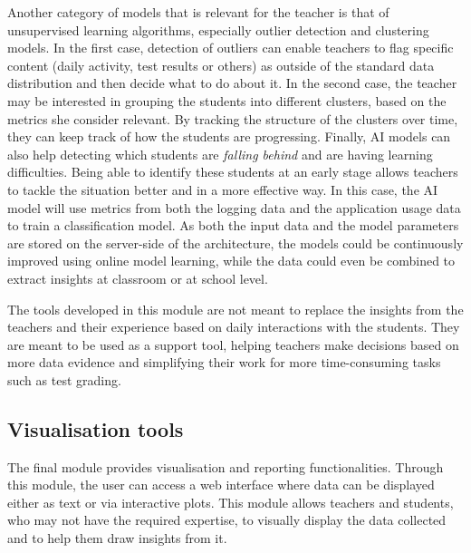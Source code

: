 Another category of models that is relevant for the teacher is that of unsupervised learning algorithms, especially outlier detection and clustering models. In the first case, detection of outliers can enable teachers to flag specific content (daily activity, test results or others) as outside of the standard data distribution and then decide what to do about it. In the second case, the teacher may be interested in grouping the students into different clusters, based on the metrics she consider relevant. By tracking the structure of the clusters over time, they can keep track of how the students are progressing. Finally, AI models can also help detecting which students are \textit{falling behind} and are having learning difficulties. Being able to identify these students at an early stage allows teachers to tackle the situation better and in a more effective way. In this case, the AI model will use metrics from both the logging data and the application usage data to train a classification model. As both the input data and the model parameters are stored on the server-side of the architecture, the models could be continuously improved using online model learning, while the data could even be combined to extract insights at classroom or at school level.

The tools developed in this module are not meant to replace the insights from the teachers and their experience based on daily interactions with the students. They are meant to be used as a support tool, helping teachers make decisions based on more data evidence and simplifying their work for more time-consuming tasks such as test grading.

\subsection{Visualisation tools}\label{arch:architecture:visual}

The final module provides visualisation and reporting functionalities. Through this module, the user can access a web interface where data can be displayed either as text or via interactive plots.
This module allows teachers and students, who may not have the required expertise, to visually display the data collected and to help them draw insights from it.

